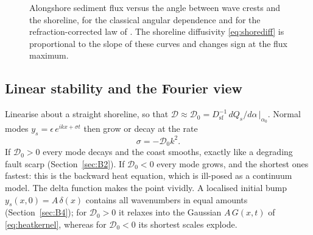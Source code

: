 \documentclass[11pt,letterpaper]{article}
\numberwithin{equation}{section}
\begin{document}
\begin{figure}[htbp]
\centering
{}
\caption{Alongshore sediment flux versus the angle between wave crests and the shoreline, for the classical angular dependence and
for the refraction-corrected law of \citet{ashton2006}. The shoreline diffusivity \eqref{eq:shorediff} is proportional to the slope of
these curves and changes sign at the flux maximum.}
\label{fig:shoreline}
\end{figure}

\subsection{Linear stability and the Fourier view}
Linearise about a straight shoreline, so that $\mathcal D\approx\mathcal D_0=D_{\mathrm{sf}}^{-1}\,dQ_s/d\alpha\,|_{\alpha_0}$. Normal modes
$y_s=\epsilon\,e^{ikx+\sigma t}$ then grow or decay at the rate
\begin{equation}\label{eq:growth}
\sigma=-\mathcal D_0k^2 .
\end{equation}
If $\mathcal D_0>0$ every mode decays and the coast smooths, exactly like a degrading fault scarp (Section~\ref{sec:B2}). If
$\mathcal D_0<0$ every mode grows, and the shortest ones fastest: this is the backward heat equation, which is ill-posed as a
continuum model. The delta function makes the point vividly. A localised initial bump $y_s(x,0)=A\,\delta(x)$ contains all wavenumbers
in equal amounts (Section~\ref{sec:B4}); for $\mathcal D_0>0$ it relaxes into the Gaussian $A\,G(x,t)$ of \eqref{eq:heatkernel}, whereas for
$\mathcal D_0<0$ its shortest scales explode.
\end{document}
